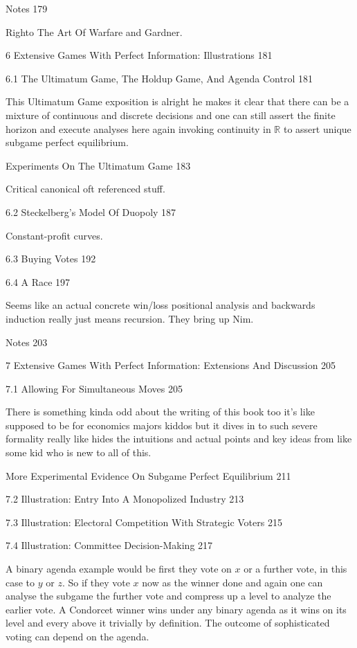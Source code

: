 Notes 179

Righto The Art Of Warfare and Gardner.

6 Extensive Games With Perfect Information: Illustrations 181



6.1 The Ultimatum Game, The Holdup Game, And Agenda Control 181

This Ultimatum Game exposition is alright he makes it clear that there can be a mixture of continuous and discrete decisions and one can still assert the finite horizon and execute analyses here again invoking continuity in $\mathbb{R}$ to assert unique subgame perfect equilibrium.

Experiments On The Ultimatum Game 183

Critical canonical oft referenced stuff.

6.2 Steckelberg's Model Of Duopoly 187

Constant-profit curves.

6.3 Buying Votes 192



6.4 A Race 197

Seems like an actual concrete win/loss positional analysis and backwards induction really just means recursion. They bring up Nim.

Notes 203



7 Extensive Games With Perfect Information: Extensions And Discussion 205



7.1 Allowing For Simultaneous Moves 205

There is something kinda odd about the writing of this book too it's like supposed to be for economics majors kiddos but it dives in to such severe formality really like hides the intuitions and actual points and key ideas from like some kid who is new to all of this.

More Experimental Evidence On Subgame Perfect Equilibrium 211



7.2 Illustration: Entry Into A Monopolized Industry 213



7.3 Illustration: Electoral Competition With Strategic Voters 215



7.4 Illustration: Committee Decision-Making 217

A binary agenda example would be first they vote on $x$ or a further vote, in this case to $y$ or $z$. So if they vote $x$ now as the winner done and again one can analyse the subgame the further vote and compress up a level to analyze the earlier vote. A Condorcet winner wins under any binary agenda as it wins on its level and every above it trivially by definition. The outcome of sophisticated voting can depend on the agenda.


